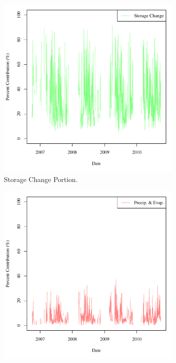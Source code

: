 \begin{figure}[htbp]
\begin{subfigure}{0.5\textwidth}
		\includegraphics[width=\tableCustomSize]{"Figures/Results_USR/Stochastic/M Water Contrib 3"}
		\caption{Storage Change Portion.}
	\end{subfigure}
	\tablevspace
	\begin{subfigure}{0.5\textwidth}
		\centering
		\includegraphics[width=\tableCustomSize]{"Figures/Results_USR/Stochastic/M Water Contrib 2"}

\end{subfigure}
\end{figure}

